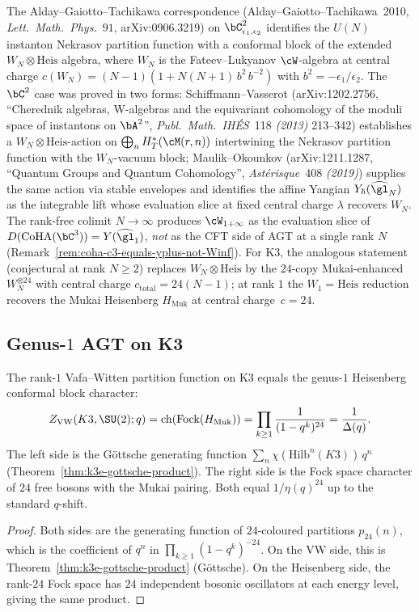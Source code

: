 The Alday--Gaiotto--Tachikawa correspondence
(Alday--Gaiotto--Tachikawa~2010, \emph{Lett.~Math.~Phys.}~$91$,
arXiv:0906.3219) on $\bC^2_{\epsilon_1, \epsilon_2}$ identifies the
$U(N)$ instanton Nekrasov partition function with a conformal block of
the extended $W_N \otimes \mathrm{Heis}$ algebra, where $W_N$ is the
Fateev--Lukyanov $\cW$-algebra at central charge
$c(W_N) = (N - 1)(1 + N(N + 1)\, b^2\, b^{-2})$ with
$b^2 = -\epsilon_1/\epsilon_2$. The $\bC^2$ case was proved in two
forms: Schiffmann--Vasserot (arXiv:1202.2756,
``Cherednik algebras, W-algebras and the equivariant cohomology of the
moduli space of instantons on $\bA^2$'', \emph{Publ.\ Math.\ IH\'ES}~118
\emph{(2013)} 213--342) establishes a $W_N \otimes \mathrm{Heis}$-action
on $\bigoplus_n H^*_T(\cM(r, n))$ intertwining the Nekrasov partition
function with the $W_N$-vacuum block; Maulik--Okounkov (arXiv:1211.1287,
``Quantum Groups and Quantum Cohomology'', \emph{Ast\'erisque}~408
\emph{(2019)}) supplies the same action via stable envelopes and
identifies the affine Yangian $Y_\hbar(\widehat{\gl}_N)$ as the
integrable lift whose evaluation slice at fixed central charge
$\lambda$ recovers $W_N$. The rank-free colimit $N \to \infty$ produces
$\cW_{1 + \infty}$ as the evaluation slice of
$D(\mathrm{CoHA}(\bC^3)) = Y(\widehat{\gl}_1)$, \emph{not} as the CFT
side of AGT at a single rank $N$
\textup{(}Remark~\ref{rem:coha-c3-equals-yplus-not-Winf}\textup{).}
For $\mathrm K3$, the analogous statement (conjectural at rank $N \geq 2$)
replaces $W_N \otimes \mathrm{Heis}$ by the $24$-copy Mukai-enhanced
$W_N^{\otimes 24}$ with central charge $c_{\mathrm{total}} = 24(N - 1)$;
at rank $1$ the $W_1 = \mathrm{Heis}$ reduction recovers the Mukai
Heisenberg $H_{\mathrm{Muk}}$ at central charge~$c = 24$.

\subsection{Genus-\texorpdfstring{$1$}{1} AGT on K3}
\label{subsec:k3e-agt-genus1}

\begin{proposition}
\label{prop:k3e-agt-genus1}
The rank-$1$ Vafa--Witten partition function on K3 equals the genus-$1$ Heisenberg conformal block character:
\[
 Z_{\mathrm{VW}}(K3, \SU(2); q)
 = \mathrm{ch}(\mathrm{Fock}(H_{\mathrm{Muk}}))
 = \prod_{k \geq 1} \frac{1}{(1 - q^k)^{24}}
 = \frac{1}{\Delta(q)}.
\]
The left side is the G\"ottsche generating function $\sum_n \chi(\mathrm{Hilb}^n(K3)) \, q^n$ (Theorem~\ref{thm:k3e-gottsche-product}). The right side is the Fock space character of $24$ free bosons with the Mukai pairing. Both equal $1/\eta(q)^{24}$ up to the standard $q$-shift.
\end{proposition}
\begin{proof}
Both sides are the generating function of $24$-coloured partitions $p_{24}(n)$, which is the coefficient of $q^n$ in $\prod_{k \geq 1} (1-q^k)^{-24}$. On the VW side, this is Theorem~\ref{thm:k3e-gottsche-product} (G\"ottsche). On the Heisenberg side, the rank-$24$ Fock space has $24$ independent bosonic oscillators at each energy level, giving the same product.
\end{proof}

